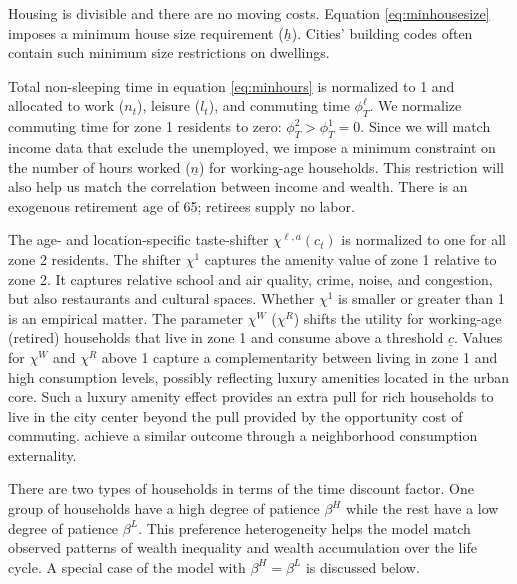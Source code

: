 \documentclass[letterpaper,12pt,dvipsnames,usenames]{article}
\newcommand{\comment}[1]{\ifcomments {\color{red} [#1]} \fi}
\theoremstyle{definition}
\begin{document}
\begin{spacing}{1.25}
Housing is divisible and there are no moving costs. Equation \eqref{eq:minhousesize} imposes a minimum house size requirement ($\underline{h}$). Cities' building codes often contain such minimum size restrictions on dwellings.

Total non-sleeping time in equation \eqref{eq:minhours} is normalized to 1 and allocated to work ($n_t$), leisure ($l_t$), and commuting time $\phi_{T}^{\ell}$. We normalize commuting time for zone 1 residents to zero: $\phi_{T}^{2}>\phi_{T}^{1}=0$. Since we will match income data that exclude the unemployed, we impose a minimum constraint
on the number of hours worked ($\underline{n}$) for working-age households. This restriction will also help us match the correlation between income and wealth. There is an exogenous retirement age of 65; retirees supply no labor.

The age- and location-specific taste-shifter $\chi^{\ell,a}(c_t)$ is normalized to one for all zone 2 residents. The shifter $\chi^{1}$ captures the amenity value of zone 1 relative to zone 2. It captures relative school and air quality, crime, noise, and congestion, but also restaurants and cultural spaces. Whether $\chi^{1}$ is smaller or greater than 1 is an empirical matter. The parameter $\chi^W$ ($\chi^R$) shifts the utility for working-age (retired) households that live in zone 1 and consume above a threshold $\underline{c}$. Values for $\chi^W$ and $\chi^R$ above 1 capture a complementarity between living in zone 1 and high consumption levels, possibly reflecting luxury amenities located in the urban core. Such a luxury amenity effect provides an extra pull for rich households to live in the city center beyond the pull provided by the opportunity cost of commuting.  \citet{GHH:13}  achieve a similar outcome through a neighborhood consumption externality. %

There are two types of households in terms of the time discount factor. One group of households have a high degree of patience $\beta^H$ while the rest have a low degree of patience $\beta^L$. This preference heterogeneity helps the model match observed patterns of  wealth inequality and wealth accumulation over the life cycle. A special case of the model with $\beta^H=\beta^L$  is discussed below.


\end{spacing}
\end{document}
